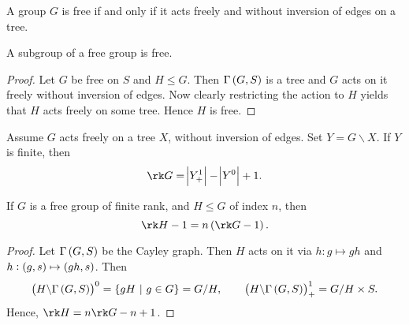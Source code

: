 \begin{theorem}
\label{thm:1.6.19}
A group $ G $ is free if and only if it acts freely and without inversion of edges on a tree.
\end{theorem}

\begin{theorem}
A subgroup of a free group is free.
\end{theorem}

\begin{proof}
Let $ G $ be free on $ S $ and $ H \le G $. Then $ \Gamma\br{G, S} $ is a tree and $ G  $ acts on it freely without inversion of edges. Now clearly restricting the action to $ H $ yields that $ H $ acts freely on some tree. Hence $ H $ is free.
\end{proof}

\pagebreak

\begin{exercise}
Assume $ G $ acts freely on a tree $ X $, without inversion of edges. Set $ Y = G \backslash X $. If $ Y $ is finite, then
$$ \rk G = \abs{Y_+^1} - \abs{Y^0} + 1. $$
\end{exercise}

\begin{lemma}
If $ G $ is a free group of finite rank, and $ H \le G $ of index $ n $, then
$$ \rk H - 1 = n\br{\rk G - 1}. $$
\end{lemma}

\begin{proof}
Let $ \Gamma\br{G, S} $ be the Cayley graph. Then $ H $ acts on it via $ h : g \mapsto gh $ and $ h : \br{g, s} \mapsto \br{gh, s} $. Then
$$ \br{H \backslash \Gamma\br{G, S}}^0 = \cbr{gH \st g \in G} = G / H, \qquad \br{H \backslash \Gamma\br{G, S}}_+^1 = G / H \times S. $$
Hence, $ \rk H = n\rk G - n + 1 $.
\end{proof}


